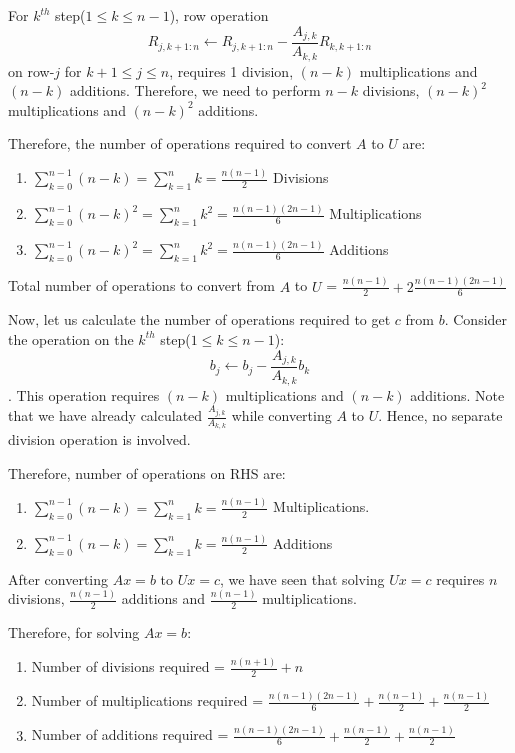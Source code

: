 \documentclass[
]{book}
\begin{document}
For \(k^{th}\) step(\(1\le k\le n-1\)), row operation \[R_{j,k+1:n} \gets R_{j,k+1:n} - \frac{A_{j,k}}{A_{k,k}}R_{k,k+1:n}\] on row-\(j\) for \(k+1\le j\le n\), requires 1 division, \((n-k)\) multiplications and \((n-k)\) additions. Therefore, we need
to perform \(n-k\) divisions, \((n-k)^2\) multiplications and \((n-k)^2\) additions.

Therefore, the number of operations required to convert \(A\) to \(U\) are:

\begin{enumerate}
\def\labelenumi{\arabic{enumi}.}
\item
  \(\sum_{k=0}^{n-1} (n-k) = \sum_{k=1}^n k = \frac{n(n-1)}{2}\) Divisions
\item
  \(\sum_{k=0}^{n-1} (n-k)^2 = \sum_{k=1}^n k^2 = \frac{n(n-1)(2n-1)}{6}\) Multiplications
\item
  \(\sum_{k=0}^{n-1} (n-k)^2 = \sum_{k=1}^n k^2 = \frac{n(n-1)(2n-1)}{6}\) Additions
\end{enumerate}

Total number of operations to convert from \(A\) to \(U\) = \(\frac{n(n-1)}{2}+2\frac{n(n-1)(2n-1)}{6}\)

Now, let us calculate the number of operations required to get \(c\) from \(b\). Consider the operation on the \(k^{th}\) step(\(1\le k\le n-1\)): \[b_j \gets b_j - \frac{A_{j,k}}{A_{k,k}} b_k\]. This operation requires \((n-k)\) multiplications and \((n-k)\) additions. Note that we have already calculated \(\frac{A_{j,k}}{A_{k,k}}\) while converting \(A\) to \(U\). Hence, no separate division operation is involved.

Therefore, number of operations on RHS are:

\begin{enumerate}
\def\labelenumi{\arabic{enumi}.}
\item
  \(\sum_{k=0}^{n-1} (n-k) = \sum_{k=1}^n k = \frac{n(n-1)}{2}\) Multiplications.
\item
  \(\sum_{k=0}^{n-1} (n-k) = \sum_{k=1}^n k = \frac{n(n-1)}{2}\) Additions
\end{enumerate}

After converting \(Ax=b\) to \(Ux=c\), we have seen that solving \(Ux=c\) requires \(n\) divisions, \(\frac{n(n-1)}{2}\) additions and \(\frac{n(n-1)}{2}\) multiplications.

Therefore, for solving \(Ax=b\):

\begin{enumerate}
\def\labelenumi{\arabic{enumi}.}
\item
  Number of divisions required = \(\frac{n(n+1)}{2}+n\)
\item
  Number of multiplications required = \(\frac{n(n-1)(2n-1)}{6}+\frac{n(n-1)}{2}+\frac{n(n-1)}{2}\)
\item
  Number of additions required = \(\frac{n(n-1)(2n-1)}{6}+\frac{n(n-1)}{2}+\frac{n(n-1)}{2}\)
\end{enumerate}
\end{document}
